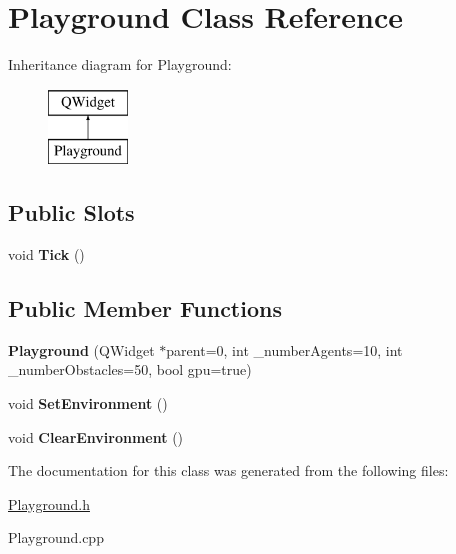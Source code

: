 \hypertarget{class_playground}{\section{Playground Class Reference}
\label{class_playground}
}
Inheritance diagram for Playground\-:\begin{figure}[H]
\begin{center}
\leavevmode
\includegraphics[height=2.000000cm]{class_playground}
\end{center}
\end{figure}
\subsection*{Public Slots}
\begin{DoxyCompactItemize}
\item 
\hypertarget{class_playground_ab3c25c89b13c23be55015f3ab1254714}{void {\bfseries Tick} ()}\label{class_playground_ab3c25c89b13c23be55015f3ab1254714}

\end{DoxyCompactItemize}
\subsection*{Public Member Functions}
\begin{DoxyCompactItemize}
\item 
\hypertarget{class_playground_a69d8c8d62d46a4b35d4c77712d28d534}{{\bfseries Playground} (Q\-Widget $\ast$parent=0, int \-\_\-number\-Agents=10, int \-\_\-number\-Obstacles=50, bool gpu=true)}\label{class_playground_a69d8c8d62d46a4b35d4c77712d28d534}

\item 
\hypertarget{class_playground_ae7a9de301b14f2736ffb7f89796edf6f}{void {\bfseries Set\-Environment} ()}\label{class_playground_ae7a9de301b14f2736ffb7f89796edf6f}

\item 
\hypertarget{class_playground_a9c0b6aeb815da539f130808210e14e17}{void {\bfseries Clear\-Environment} ()}\label{class_playground_a9c0b6aeb815da539f130808210e14e17}

\end{DoxyCompactItemize}


The documentation for this class was generated from the following files\-:\begin{DoxyCompactItemize}
\item 
\hyperlink{_playground_8h}{Playground.\-h}\item 
Playground.\-cpp\end{DoxyCompactItemize}
